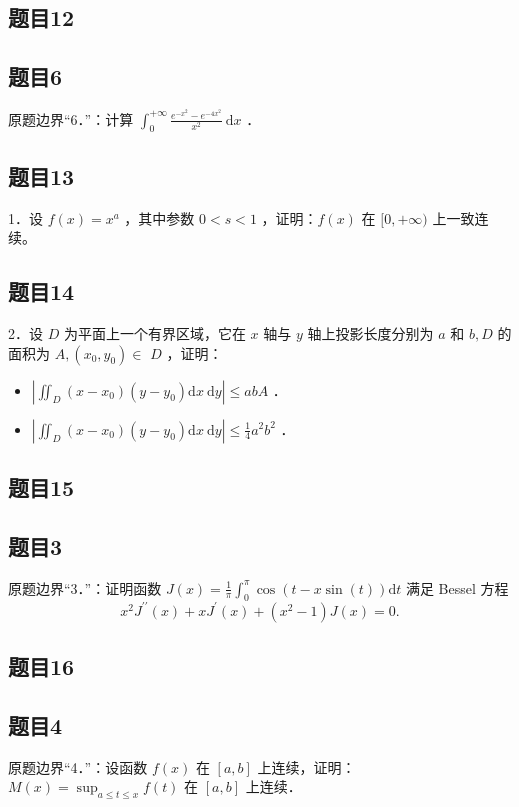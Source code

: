 \documentclass{article}
\begin{document}
\subsection{题目12}

\subsection{题目6}
原题边界“6．”：计算 \(\int_{0}^{+\infty} \frac{e^{-x^{2}}-e^{-4 x^{2}}}{x^{2}} \mathrm{~d} x\) ．

\subsection{题目13}
1．设 \(f(x)=x^{a}\) ，其中参数 \(0<s<1\) ，证明：\(f(x)\) 在 \([0,+\infty)\) 上一致连续。

\subsection{题目14}
2．设 \(D\) 为平面上一个有界区域，它在 \(x\) 轴与 \(y\) 轴上投影长度分别为 \(a\) 和 \(b, D\) 的面积为 \(A,\left(x_{0}, y_{0}\right) \in\) \(D\) ，证明：

\begin{itemize}
  \item[（1）] \(\left|\iint_{D}\left(x-x_{0}\right)\left(y-y_{0}\right) \mathrm{d} x \mathrm{~d} y\right| \leq a b A\) ．
  \item[（2）] \(\left|\iint_{D}\left(x-x_{0}\right)\left(y-y_{0}\right) \mathrm{d} x \mathrm{~d} y\right| \leq \frac{1}{4} a^{2} b^{2}\) ．
\end{itemize}

\begin{itemize}

\subsection{题目15}
\end{itemize}

\subsection{题目3}
原题边界“3．”：证明函数 \(J(x)=\frac{1}{\pi} \int_{0}^{\pi} \cos (t-x \sin (t)) \mathrm{d} t\) 满足 Bessel 方程
\[
x^{2} J^{\prime \prime}(x)+x J^{\prime}(x)+\left(x^{2}-1\right) J(x)=0 .
\]

\subsection{题目16}

\subsection{题目4}
原题边界“4．”：设函数 \(f(x)\) 在 \([a, b]\) 上连续，证明：\(M(x)=\sup _{a \leq t \leq x} f(t)\) 在 \([a, b]\) 上连续．
\end{document}
